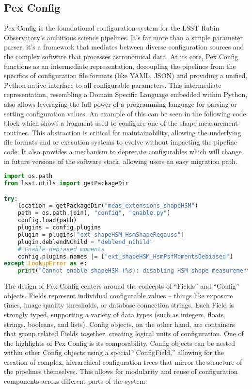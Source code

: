 \subsection{Pex Config}

Pex Config is the foundational configuration system for the LSST Rubin Observatory's ambitious science pipelines.
It's far more than a simple parameter parser; it's a framework that mediates between diverse configuration sources and the complex software that processes astronomical data.
At its core, Pex Config functions as an intermediate representation, decoupling the pipelines from the specifics of configuration file formats (like YAML, JSON) and providing a unified, Python-native interface to all configurable parameters.
This intermediate representation, resembling a Domain Specific Language embedded within Python, also allows leveraging the full power of a programming language for parsing or setting configuration values.
An example of this can be seen in the following code block which shows a fragment used to configure one of the shape measurement routines.
This abstraction is critical for maintainability, allowing the underlying file formats and or execution systems to evolve without impacting the pipeline code.
It also provides a mechanism to deprecate configurables which will change in future versions of the software stack, allowing users an easy migration path.

\begin{minipage}{\columnwidth}
    \begin{lstlisting}[caption=Code configuration in python, language=python]
import os.path
from lsst.utils import getPackageDir

try:
    location = getPackageDir("meas_extensions_shapeHSM")
    path = os.path.join(, "config", "enable.py")
    config.load(path)
    plugins = config.plugins
    plugin = plugins["ext_shapeHSM_HsmShapeRegauss"]
    plugin.deblendNChild = "deblend_nChild"
    # Enable debiased moments
    config.plugins.names |= ["ext_shapeHSM_HsmPsfMomentsDebiased"]
except LookupError as e:
    print("Cannot enable shapeHSM (%s): disabling HSM shape measurements" % (e,))
    \end{lstlisting}
\end{minipage}



The design of Pex Config centers around the concepts of ``Fields'' and ``Config'' objects.
Fields represent individual configurable values -- things like exposure times, image quality thresholds, or database connection strings.
Each Field is strongly typed, supporting a variety of data types (such as integers, floats, strings, booleans, and lists).
Config objects, on the other hand, are containers that group related Fields together, creating logical units of configuration.
One of the highlights of Pex Config is its composability.
Config objects can be nested within other Config objects using a special ``ConfigField,'' allowing for the creation of complex, hierarchical configuration trees that mirror the structure of the pipelines themselves.
This allows for modularity and reuse of configuration components across different parts of the system.

